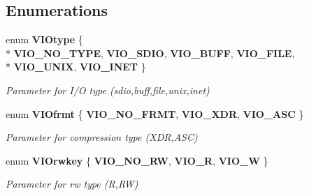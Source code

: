 \subsection*{Enumerations}
\begin{DoxyCompactItemize}
\item 
enum {\bf V\+I\+Otype} \{ \\*
{\bf V\+I\+O\+\_\+\+N\+O\+\_\+\+T\+Y\+P\+E}, 
{\bf V\+I\+O\+\_\+\+S\+D\+I\+O}, 
{\bf V\+I\+O\+\_\+\+B\+U\+F\+F}, 
{\bf V\+I\+O\+\_\+\+F\+I\+L\+E}, 
\\*
{\bf V\+I\+O\+\_\+\+U\+N\+I\+X}, 
{\bf V\+I\+O\+\_\+\+I\+N\+E\+T}
 \}
\begin{DoxyCompactList}\small\item\em Parameter for I/\+O type (sdio,buff,file,unix,inet) \end{DoxyCompactList}\item 
enum {\bf V\+I\+Ofrmt} \{ {\bf V\+I\+O\+\_\+\+N\+O\+\_\+\+F\+R\+M\+T}, 
{\bf V\+I\+O\+\_\+\+X\+D\+R}, 
{\bf V\+I\+O\+\_\+\+A\+S\+C}
 \}
\begin{DoxyCompactList}\small\item\em Parameter for compression type (X\+D\+R,A\+S\+C) \end{DoxyCompactList}\item 
enum {\bf V\+I\+Orwkey} \{ {\bf V\+I\+O\+\_\+\+N\+O\+\_\+\+R\+W}, 
{\bf V\+I\+O\+\_\+\+R}, 
{\bf V\+I\+O\+\_\+\+W}
 \}
\begin{DoxyCompactList}\small\item\em Parameter for rw type (R,R\+W) \end{DoxyCompactList}\end{DoxyCompactItemize}
